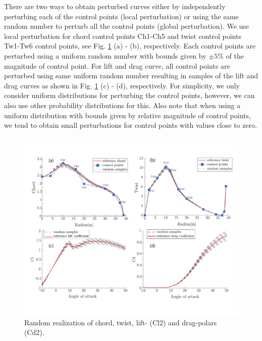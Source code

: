 \documentclass[review]{elsarticle}
\numberwithin{equation}{section}
\numberwithin{equation}{section}
\begin{document}
There are two ways to obtain perturbed curves either by independently perturbing each of the control points (local perturbation) or using the same random number to perturb all the control points (global perturbation). We use local perturbation for chord control points Ch1-Ch5 and twist control points Tw1-Tw6 control points, see Fig. \ref{perturbed_samples} (a) - (b), respectively. Each control points are perturbed using a uniform random number with bounds given by $\pm5\%$ of the magnitude of control point. For lift and drag curve, all control points are perturbed using same uniform random number resulting in samples of the lift and drag curves as shown in Fig. \ref{perturbed_samples} (c) - (d), respectively. For simplicity, we only consider uniform distributions for perturbing the control points, however, we can also use other probability distributions for this. Also note that when using a uniform distribution with bounds given by relative magnitude of control points, we tend to obtain small perturbations for control points with values close to zero.
\begin{figure}[h!]
\centering
\includegraphics[trim={0 1.6cm 0 1.5cm},clip, scale=0.67]{figure1.pdf}
\caption{Random realization of chord, twist, lift- (Cl2) and drag-polars (Cd2).}
\label{perturbed_samples}
\end{figure}
\end{document}
